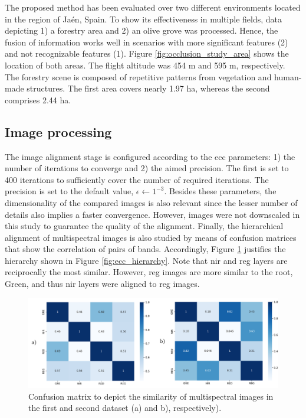 The proposed method has been evaluated over two different environments located in the region of Jaén, Spain. To show its effectiveness in multiple fields, data depicting 1) a forestry area and 2) an olive grove was processed. Hence, the fusion of information works well in scenarios with more significant features (2) and not recognizable features (1). Figure \ref{fig:occlusion_study_area} shows the location of both areas. The flight altitude was 454 \si{\meter} and 595 \si{\meter}, respectively. The forestry scene is composed of repetitive patterns from vegetation and human-made structures. The first area covers nearly 1.97 \si{\hectare}, whereas the second comprises 2.44 \si{\hectare}.

\subsection{Image processing}

The image alignment stage is configured according to the \acrshort{ecc} parameters: 1) the number of iterations to converge and 2) the aimed precision. The first is set to 400 iterations to sufficiently cover the number of required iterations. The precision is set to the default value, $\epsilon \gets 1^{-3}$. Besides these parameters, the dimensionality of the compared images is also relevant since the lesser number of details also implies a faster convergence. However, images were not downscaled in this study to guarantee the quality of the alignment. Finally, the hierarchical alignment of multispectral images is also studied by means of confusion matrices that show the correlation of pairs of bands. Accordingly, Figure \ref{fig:occlusion_confusion_matrices} justifies the hierarchy shown in Figure \ref{fig:ecc_hierarchy}. Note that \acrshort{nir} and \acrshort{reg} layers are reciprocally the most similar. However, \acrshort{reg} images are more similar to the root, Green, and thus \acrshort{nir} layers were aligned to \acrshort{reg} images.

\begin{figure}[ht]
    \centering
    \includegraphics[width=\linewidth]{figs/multi_thermal_projection/results/confusion_matrices.png}
    \caption{Confusion matrix to depict the similarity of multispectral images in the first and second dataset (a) and b), respectively).}
    \label{fig:occlusion_confusion_matrices}
\end{figure}


